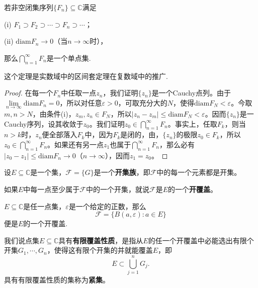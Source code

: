 \documentclass[../../main.tex]{subfiles}%
\begin{document}
\begin{theorem}[Cantor闭集套定理]\label{theorem:复变函数--Cantor闭集套定理}
若非空闭集序列\(\{ F_n \}\subseteq \mathbb{C}\)满足

(i) \(F_1 \supset F_2 \supset \cdots \supset F_n \supset \cdots\)；

(ii) \(\mathrm{diam}F_n \to 0\)（当\(n \to \infty\)时），

那么\(\bigcap_{n = 1}^\infty F_n\)是一个单点集.
\end{theorem}
\begin{note}
这个定理是实数域中的区间套定理在复数域中的推广.
\end{note}
\begin{proof}
在每一个\(F_n\)中任取一点\(z_n\)，我们证明\(\{ z_n \}\)是一个Cauchy点列。由于\(\lim\limits_{n \to \infty}\mathrm{diam}F_n = 0\)，所以对任意\(\varepsilon > 0\)，可取充分大的\(N\)，使得\(\mathrm{diam}F_N < \varepsilon\)。今取\(m, n > N\)，由条件(i)，\(z_m, z_n \in F_N\)，所以\(| z_n - z_m | \leqslant \mathrm{diam}F_N < \varepsilon\)。因而\(\{ z_n \}\)是一Cauchy序列，设其收敛于\(z_0\)。我们证明\(z_0 \in \bigcap_{n = 1}^\infty F_n\)。事实上，任取\(F_k\)，则当\(n > k\)时，\(z_n\)便全部落入\(F_k\)中，因为\(F_k\)是闭的，由，\(\{ z_n \}\)的极限\(z_0 \in F_k\)，所以\(z_0 \in \bigcap_{n = 1}^\infty F_n\)。如果还有另一点\(z_1\)也属于\(\bigcap_{n = 1}^\infty F_n\)，那么必有\(| z_0 - z_1 | \leqslant \mathrm{diam}F_n \to 0\)（\(n \to \infty\)），因而\(z_1 = z_0\)。 
\end{proof}

\begin{definition}
设\(E\subseteq \mathbb{C}\)是一个集，\(\mathscr{F} = \{ G \}\)是一个\textbf{开集族}，即\(\mathscr{F}\)中的每一个元素都是开集。

如果\(E\)中每一点至少属于\(\mathscr{F}\)中的一个开集，就说\(\mathscr{F}\)是\(E\)的一个\textbf{开覆盖}。
\end{definition}

\begin{example}
\(E\subseteq \mathbb{C}\)是任一点集，\(\varepsilon\)是一个给定的正数，那么
\[
\mathscr{F} = \{ B(a, \varepsilon) : a \in E \}
\]
便是\(E\)的一个开覆盖.
\end{example}

\begin{definition}
我们说点集\(E\subseteq \mathbb{C}\)具有\textbf{有限覆盖性质}，是指从\(E\)的任一个开覆盖中必能选出有限个开集\(G_1, \cdots, G_n\)，使得这有限个开集的并就能覆盖\(E\)，即
\[
E \subset \bigcup_{j = 1}^n G_j.
\]
具有有限覆盖性质的集称为\textbf{紧集}。
\end{definition}
\end{document}
